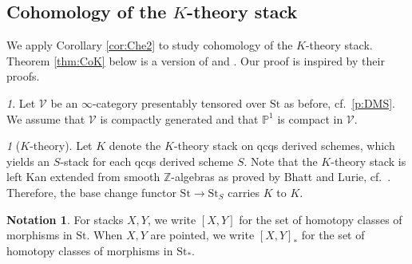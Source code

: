 \documentclass{amsart}
\theoremstyle{plain}
\theoremstyle{definition}
\newtheorem{notation}[theorem]{Notation}
\theoremstyle{remark}
\newtheorem{p}[theorem]{}
\numberwithin{equation}{theorem}
\newcommand{\mbb}[1]{\mathbb{#1}}
\newcommand{\St}{\mathrm{St}}
\newcommand{\V}{\mathcal{V}}
\begin{document}
\subsection{Cohomology of the $K$-theory stack}\label{CoK}

We apply Corollary \ref{cor:Che2} to study cohomology of the $K$-theory stack.
Theorem \ref{thm:CoK} below is a version of \cite[Proposition 2.27]{GS} and \cite[Proposition 5.1.1]{Rio}.
Our proof is inspired by their proofs.

\begin{p}
Let $\V$ be an $\infty$-category presentably tensored over $\St$ as before, cf.\ \ref{p:DMS}.
We assume that $\V$ is compactly generated and that $\mbb{P}^1$ is compact in $\V$.
\end{p}

\begin{p}[$K$-theory]
Let $K$ denote the $K$-theory stack on qcqs derived schemes, which yields an $S$-stack for each qcqs derived scheme $S$.
Note that the $K$-theory stack is left Kan extended from smooth $\mbb{Z}$-algebras as proved by Bhatt and Lurie, cf.\ \cite[Appendix A]{EHKSY}.
Therefore, the base change functor $\St\to\St_S$ carries $K$ to $K$.
\end{p}

\begin{notation}
For stacks $X,Y$, we write $[X,Y]$ for the set of homotopy classes of morphisms in $\St$.
When $X,Y$ are pointed, we write $[X,Y]_*$ for the set of homotopy classes of morphisms in $\St_*$.
\end{notation}
\end{document}
